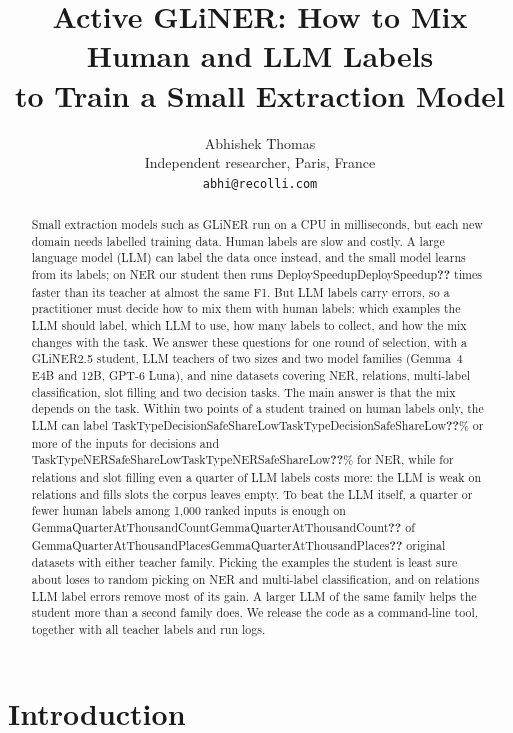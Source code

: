\documentclass[11pt]{article}
\title{Active GLiNER: How to Mix Human and LLM Labels\\to Train a Small Extraction Model}
\author{Abhishek Thomas \\
  Independent researcher, Paris, France \\
  \texttt{abhi@recolli.com}}
\newcommand{\res}[1]{\ifcsname #1\endcsname\csname #1\endcsname\else\textbf{??}\fi}
\begin{document}
\raggedbottom
\maketitle

\begin{abstract}
Small extraction models such as GLiNER run on a CPU in milliseconds, but each new domain needs labelled training data. Human labels are slow and costly. A large language model (LLM) can label the data once instead, and the small model learns from its labels; on NER our student then runs \res{DeploySpeedup} times faster than its teacher at almost the same F1. But LLM labels carry errors, so a practitioner must decide how to mix them with human labels: which examples the LLM should label, which LLM to use, how many labels to collect, and how the mix changes with the task. We answer these questions for one round of selection, with a GLiNER2.5 student, LLM teachers of two sizes and two model families (Gemma~4 E4B and 12B, GPT-6 Luna), and nine datasets covering NER, relations, multi-label classification, slot filling and two decision tasks. The main answer is that the mix depends on the task. Within two points of a student trained on human labels only, the LLM can label \res{TaskTypeDecisionSafeShareLow}\% or more of the inputs for decisions and \res{TaskTypeNERSafeShareLow}\% for NER, while for relations and slot filling even a quarter of LLM labels costs more: the LLM is weak on relations and fills slots the corpus leaves empty. To beat the LLM itself, a quarter or fewer human labels among 1{,}000 ranked inputs is enough on \res{GemmaQuarterAtThousandCount} of \res{GemmaQuarterAtThousandPlaces} original datasets with either teacher family. Picking the examples the student is least sure about loses to random picking on NER and multi-label classification, and on relations LLM label errors remove most of its gain. A larger LLM of the same family helps the student more than a second family does. We release the code as a command-line tool, together with all teacher labels and run logs.
\end{abstract}

\section{Introduction}
\end{document}
